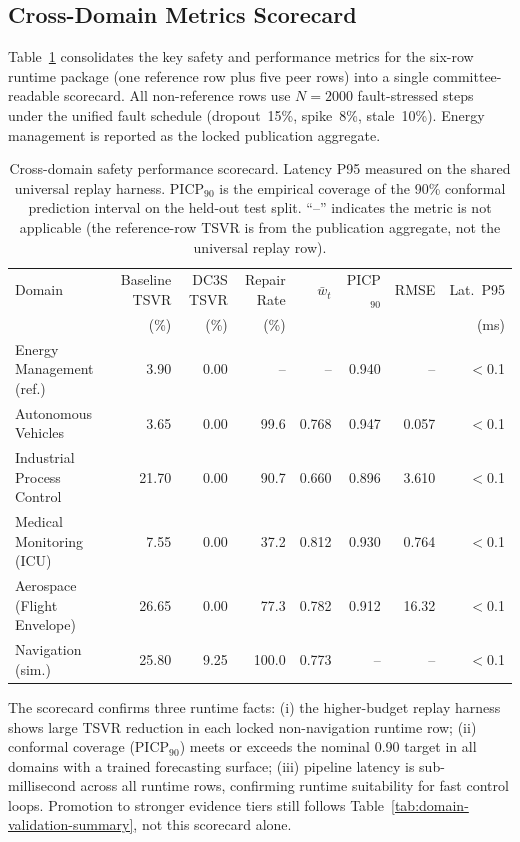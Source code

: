 \subsection{Cross-Domain Metrics Scorecard}
\label{sec:cross-domain-scorecard}

Table~\ref{tab:cross-domain-scorecard} consolidates the key safety and
performance metrics for the six-row runtime package (one reference row
plus five peer rows) into a single committee-readable scorecard.  All
non-reference rows use $N = 2000$ fault-stressed steps under the unified
fault schedule (dropout~15\%, spike~8\%, stale~10\%).  Energy management is
reported as the locked publication aggregate.

\begin{table}[htbp]
\centering
\caption{Cross-domain safety performance scorecard.  Latency P95 measured
  on the shared universal replay harness.  PICP$_{90}$ is the empirical
  coverage of the 90\% conformal prediction interval on the held-out test
  split.  ``--'' indicates the metric is not applicable (the reference-row TSVR is
  from the publication aggregate, not the universal replay row).}
\label{tab:cross-domain-scorecard}
\begin{tabular}{lrrrrrrr}
\toprule
Domain & Baseline TSVR & DC3S TSVR & Repair Rate & $\bar{w}_t$ & PICP$_{90}$ & RMSE & Lat.\ P95 \\
 & (\%) & (\%) & (\%) & & & & (ms) \\
\midrule
Energy Management (ref.)    & 3.90  & 0.00  & --    & --    & 0.940 & --     & $<$0.1 \\
Autonomous Vehicles         & 3.65  & 0.00  & 99.6  & 0.768 & 0.947 & 0.057  & $<$0.1 \\
Industrial Process Control  & 21.70 & 0.00  & 90.7  & 0.660 & 0.896 & 3.610  & $<$0.1 \\
Medical Monitoring (ICU)    & 7.55  & 0.00  & 37.2  & 0.812 & 0.930 & 0.764  & $<$0.1 \\
Aerospace (Flight Envelope) & 26.65 & 0.00  & 77.3  & 0.782 & 0.912 & 16.32  & $<$0.1 \\
Navigation (sim.)           & 25.80 & 9.25  & 100.0 & 0.773 & --    & --     & $<$0.1 \\
\bottomrule
\end{tabular}
\end{table}

The scorecard confirms three runtime facts: (i) the higher-budget replay
harness shows large TSVR reduction in each locked non-navigation runtime
row; (ii) conformal coverage (PICP$_{90}$) meets or exceeds the nominal
0.90 target in all domains with a trained forecasting surface; (iii)
pipeline latency is sub-millisecond across all runtime rows, confirming
runtime suitability for fast control loops.  Promotion to stronger
evidence tiers still follows Table~\ref{tab:domain-validation-summary},
not this scorecard alone.

